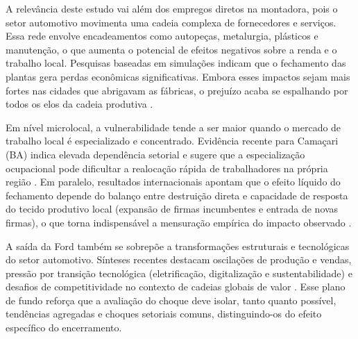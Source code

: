 \documentclass[12pt,a4paper]{article}
\begin{document}
A relev\^ancia deste estudo vai al\'em dos empregos diretos na montadora, pois o setor automotivo movimenta uma cadeia complexa de fornecedores e servi\c{c}os. Essa rede envolve encadeamentos como autopeças, metalurgia, pl\'asticos e manuten\c{c}\~ao, o que aumenta o potencial de efeitos negativos sobre a renda e o trabalho local. Pesquisas baseadas em simula\c{c}\~oes indicam que o fechamento das plantas gera perdas econ\^omicas significativas. Embora esses impactos sejam mais fortes nas cidades que abrigavam as f\'abricas, o preju\'izo acaba se espalhando por todos os elos da cadeia produtiva \parencite{domingues2020,fernandes2021}.

Em n\'ivel microlocal, a vulnerabilidade tende a ser maior quando o mercado de trabalho local \'e especializado e concentrado. Evid\^encia recente para Cama\c{c}ari (BA) indica elevada depend\^encia setorial e sugere que a especializa\c{c}\~ao ocupacional pode dificultar a realoca\c{c}\~ao r\'apida de trabalhadores na pr\'opria regi\~ao \parencite{henriques2024}. Em paralelo, resultados internacionais apontam que o efeito l\'iquido do fechamento depende do balan\c{c}o entre destrui\c{c}\~ao direta e capacidade de resposta do tecido produtivo local (expans\~ao de firmas incumbentes e entrada de novas firmas), o que torna indispens\'avel a mensura\c{c}\~ao emp\'irica do impacto observado \parencite{jofremonseny2018}.

A sa\'ida da Ford tamb\'em se sobrep\~oe a transforma\c{c}\~oes estruturais e tecnol\'ogicas do setor automotivo. S\'inteses recentes destacam oscila\c{c}\~oes de produ\c{c}\~ao e vendas, press\~ao por transi\c{c}\~ao tecnol\'ogica (eletrifica\c{c}\~ao, digitaliza\c{c}\~ao e sustentabilidade) e desafios de competitividade no contexto de cadeias globais de valor \parencite{porter1990,marx2026,vargas2021}. Esse plano de fundo refor\c{c}a que a avalia\c{c}\~ao do choque deve isolar, tanto quanto poss\'ivel, tend\^encias agregadas e choques setoriais comuns, distinguindo-os do efeito espec\'ifico do encerramento.
\end{document}
